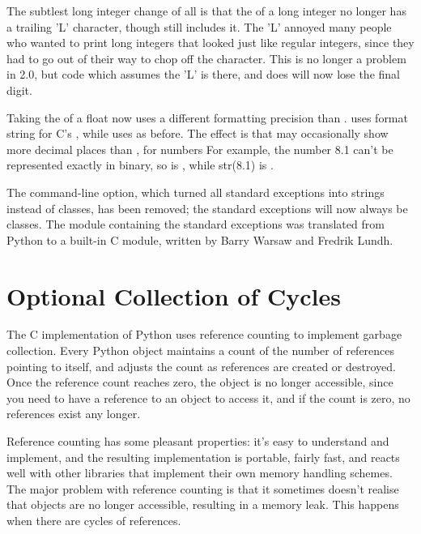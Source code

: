 \documentclass{howto}
\begin{document}
The subtlest long integer change of all is that the 
of a long integer no longer has a trailing 'L' character, though
 still includes it.  The 'L' annoyed many people who
wanted to print long integers that looked just like regular integers,
since they had to go out of their way to chop off the character.  This
is no longer a problem in 2.0, but code which assumes the 'L' is
there, and does  will now lose the final
digit.  

Taking the  of a float now uses a different
formatting precision than .   uses
 format string for C's , while
 uses  as before.  The effect is that 
 may occasionally show more decimal places than 
, for numbers 
For example, the number 8.1 can't be represented exactly in binary, so
 is , while str(8.1) is
.

The  command-line option, which turned all standard
exceptions into strings instead of classes, has been removed; the
standard exceptions will now always be classes.  The
 module containing the standard exceptions was
translated from Python to a built-in C module, written by Barry Warsaw
and Fredrik Lundh.

\section{Optional Collection of Cycles}

The C implementation of Python uses reference counting to implement
garbage collection.  Every Python object maintains a count of the
number of references pointing to itself, and adjusts the count as
references are created or destroyed.  Once the reference count reaches
zero, the object is no longer accessible, since you need to have a
reference to an object to access it, and if the count is zero, no
references exist any longer.  

Reference counting has some pleasant properties: it's easy to
understand and implement, and the resulting implementation is
portable, fairly fast, and reacts well with other libraries that
implement their own memory handling schemes.  The major problem with
reference counting is that it sometimes doesn't realise that objects
are no longer accessible, resulting in a memory leak.  This happens
when there are cycles of references.
\end{document}
